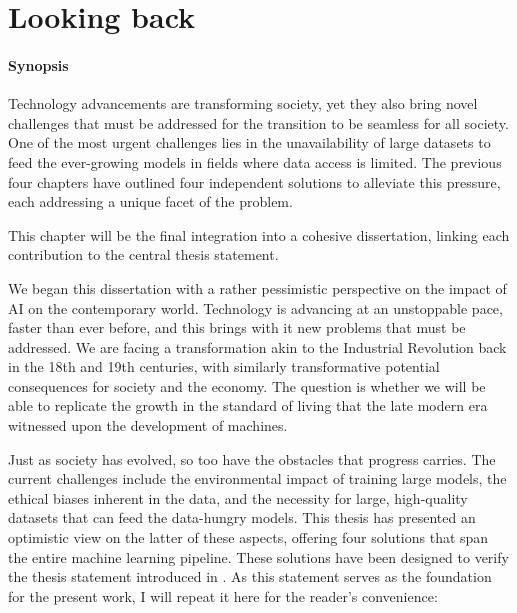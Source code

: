 \graphicspath{{ch7_discussion/}{Figures/}}

\chapter{Looking back}
\label{chapter:discussion}




\subsubsection{Synopsis} Technology advancements are transforming society, yet they also bring novel challenges that must be addressed for the transition to be seamless for all society. One of the most urgent challenges lies in the unavailability of large datasets to feed the ever-growing models in fields where data access is limited. The previous four chapters have outlined four independent solutions to alleviate this pressure, each addressing a unique facet of the problem.

This chapter will be the final integration into a cohesive dissertation, linking each contribution to the central thesis statement. 

\sectionlinenew

We began this dissertation with a rather pessimistic perspective on the impact of AI on the contemporary world. Technology is advancing at an unstoppable pace, faster than ever before, and this brings with it new problems that must be addressed. We are facing a transformation akin to the Industrial Revolution back in the 18th and 19th centuries, with similarly transformative potential consequences for society and the economy. The question is whether we will be able to replicate the growth in the standard of living that the late modern era witnessed upon the development of machines.

Just as society has evolved, so too have the obstacles that progress carries. The current challenges include the environmental impact of training large models, the ethical biases inherent in the data, and the necessity for large, high-quality datasets that can feed the data-hungry models. This thesis has presented an optimistic view on the latter of these aspects, offering four solutions that span the entire machine learning pipeline. These solutions have been designed to verify the thesis statement introduced in . As this statement serves as the foundation for the present work, I will repeat it here for the reader's convenience:
\\

